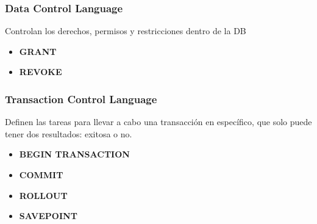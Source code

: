 \subsubsection{Data Control Language}
Controlan los derechos, permisos y restricciones dentro de la DB
\begin{itemize}
    \item {\textbf{GRANT}}
    \item {\textbf{REVOKE}}
\end{itemize}

\subsubsection{Transaction Control Language}
Definen las tareas para llevar a cabo una transacción en específico, que solo puede tener dos resultados: exitosa o no. 
\begin{itemize}
    \item {\textbf{BEGIN TRANSACTION}}
    \item {\textbf{COMMIT}}
    \item {\textbf{ROLLOUT}}
    \item {\textbf{SAVEPOINT}}
\end{itemize}

